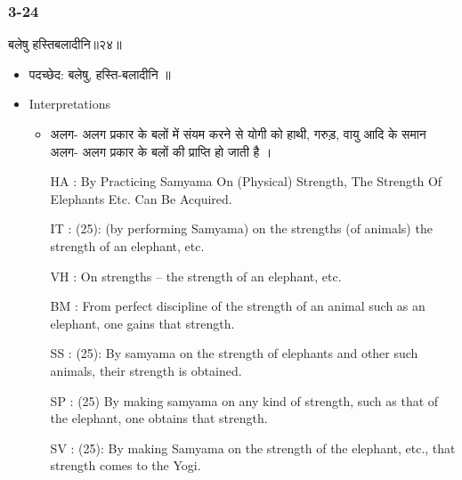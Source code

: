 \begin{frame}[fragile]\frametitle{3-24}
\begin{sanskrit}
बलेषु हस्तिबलादीनि॥२४॥
\end{sanskrit}

	\begin{itemize}
	\item पदच्छेद:  बलेषु, हस्ति-बलादीनि‌ ‌॥
	\item Interpretations
		\begin{itemize}	
		\item अलग- अलग प्रकार के बलों में संयम करने से योगी को हाथी, गरुड़, वायु आदि के समान अलग- अलग प्रकार के बलों की प्राप्ति हो जाती है ।
		\item [HA]: By Practicing Samyama On (Physical) Strength, The Strength Of Elephants Etc. Can Be Acquired.
		\item [IT]: (25): (by performing Samyama) on the strengths (of animals) the strength of an elephant, etc.
		\item [VH]: On strengths – the strength of an elephant, etc.
		\item [BM]: From perfect discipline of the strength of an animal such as an elephant, one gains that strength.
		\item [SS]: (25): By samyama on the strength of elephants and other such animals, their strength is obtained.
		\item [SP]: (25) By making samyama on any kind of strength, such as that of the elephant, one obtains that strength.
		\item [SV]: (25): By making Samyama on the strength of the elephant, etc., that strength comes to the Yogi. 
		\end{itemize}
	\end{itemize}
\end{frame}

